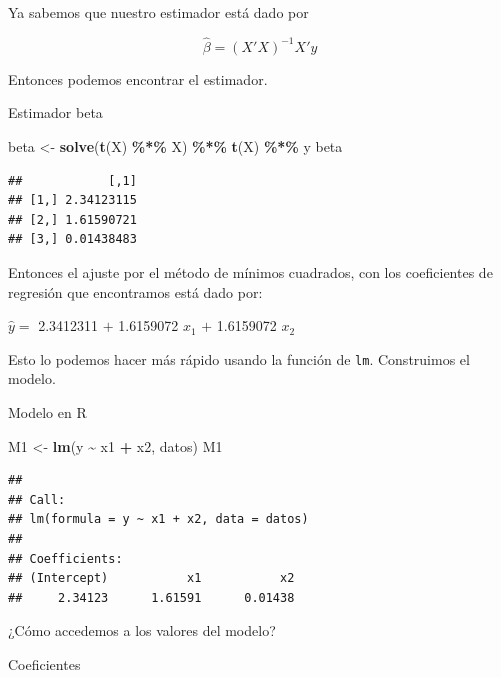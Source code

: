 \documentclass[
]{book}
\newenvironment{Shaded}{\begin{snugshade}}{\end{snugshade}}
\newcommand{\DecValTok}[1]{\textcolor[rgb]{0.00,0.00,0.81}{#1}}
\newcommand{\FunctionTok}[1]{\textcolor[rgb]{0.13,0.29,0.53}{\textbf{#1}}}
\newcommand{\NormalTok}[1]{#1}
\newcommand{\OtherTok}[1]{\textcolor[rgb]{0.56,0.35,0.01}{#1}}
\newcommand{\SpecialCharTok}[1]{\textcolor[rgb]{0.81,0.36,0.00}{\textbf{#1}}}
\begin{document}
Ya sabemos que nuestro estimador está dado por

\[
\hat{\beta} = (X'X)^{-1}X'y
\]

Entonces podemos encontrar el estimador.

Estimador beta

\begin{Shaded}
\begin{Highlighting}[]
\NormalTok{beta }\OtherTok{\textless{}{-}} \FunctionTok{solve}\NormalTok{(}\FunctionTok{t}\NormalTok{(X) }\SpecialCharTok{\%*\%}\NormalTok{ X) }\SpecialCharTok{\%*\%} \FunctionTok{t}\NormalTok{(X) }\SpecialCharTok{\%*\%}\NormalTok{ y}
\NormalTok{beta}
\end{Highlighting}
\end{Shaded}

\begin{verbatim}
##            [,1]
## [1,] 2.34123115
## [2,] 1.61590721
## [3,] 0.01438483
\end{verbatim}

Entonces el ajuste por el método de mínimos cuadrados, con los coeficientes de regresión que encontramos está dado por:

\(\hat{y} =\) 2.3412311 \(+\) 1.6159072 \(x_1\) \(+\) 1.6159072 \(x_2\)

Esto lo podemos hacer más rápido usando la función de \texttt{lm}. Construimos el modelo.

Modelo en R

\begin{Shaded}
\begin{Highlighting}[]
\NormalTok{M1 }\OtherTok{\textless{}{-}} \FunctionTok{lm}\NormalTok{(y }\SpecialCharTok{\textasciitilde{}}\NormalTok{ x1 }\SpecialCharTok{+}\NormalTok{ x2, datos)}
\NormalTok{M1 }
\end{Highlighting}
\end{Shaded}

\begin{verbatim}
## 
## Call:
## lm(formula = y ~ x1 + x2, data = datos)
## 
## Coefficients:
## (Intercept)           x1           x2  
##     2.34123      1.61591      0.01438
\end{verbatim}

¿Cómo accedemos a los valores del modelo?

Coeficientes

\begin{Shaded}
\end{Shaded}
\end{document}
